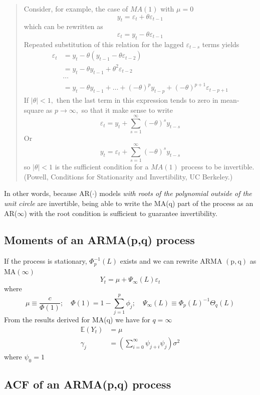 \documentclass[11pt, a4paper]{report}
\theoremstyle{plain}
\theoremstyle{plain}
\theoremstyle{remark}
\begin{document}
\begin{quote}
Consider, for example, the case of $M A(1)$ with $\mu=0$
$$
y_{t}=\varepsilon_{t}+\theta \varepsilon_{t-1}
$$
which can be rewritten as
$$
\varepsilon_{t}=y_{t}-\theta \varepsilon_{t-1}
$$
Repeated substitution of this relation for the lagged $\varepsilon_{t-s}$ terms yields
$$
\begin{aligned}
	\varepsilon_{t} &=y_{t}-\theta\left(y_{t-1}-\theta \varepsilon_{t-2}\right) \\
	&=y_{t}-\theta y_{t-1}+\theta^{2} \varepsilon_{t-2} \\
	& \cdots \\
	&=y_{t}-\theta y_{t-1}+\ldots+(-\theta)^{p} y_{t-p}+(-\theta)^{p+1} \varepsilon_{t-p+1}
\end{aligned}
$$
If $|\theta|<1,$ then the last term in this expression tends to zero in mean-square as $p \rightarrow \infty,$ so that it make
sense to write
$$
\varepsilon_{t}=y_{t}+\sum_{s=1}^{\infty}(-\theta)^{s} y_{t-s}
$$
Or
$$
y_{t}=\varepsilon_{t}+\sum_{s=1}^{\infty}(-\theta)^{s} y_{t-s}
$$
so $|\theta|<1$ is the sufficient condition for a $M A(1)$ process to be invertible. (Powell, Conditions for Stationarity and Invertibility, UC Berkeley.)
\end{quote}

In other words, because AR($\cdot$) models \textit{with roots of the polynomial outside of the unit circle} are invertible, being able to write the MA(q) part of the process as an AR($\infty$) with the root condition is sufficient to guarantee invertibility.

\subsection{Moments of an ARMA(p,q) process}

If the process is stationary, $\Phi_{p}^{-1}(L)$ exists and we can rewrite ARMA $(\mathrm{p}, \mathrm{q})$ as $\mathrm{MA}(\infty)$
$$
Y_{t}=\mu+\Psi_{\infty}(L) \varepsilon_{t}
$$
where
$$
\mu \equiv \frac{c}{\Phi(1)} ; \quad \Phi(1)=1-\sum_{j=1}^{p} \phi_{j} ; \quad \Psi_{\infty}(L) \equiv \Phi_{p}(L)^{-1} \Theta_{q}(L)
$$
From the results derived for MA(q) we have for $q=\infty$
$$
\begin{aligned}
	\mathbb{E}\left(Y_{t}\right) &=\mu \\
	\gamma_{j} &=\left(\sum_{i=0}^{\infty} \psi_{j+i} \psi_{j}\right) \sigma^{2}
\end{aligned}
$$
where $\psi_{0}=1$

\subsection{ACF of an ARMA(p,q) process}
\end{document}
